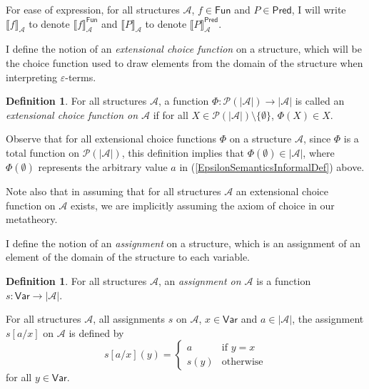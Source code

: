 \documentclass[10pt]{article}
\theoremstyle{definition}\newtheorem{remark}[theorem]{Remark}
\theoremstyle{definition}\newtheorem{example}[theorem]{Example}
\theoremstyle{definition}\newtheorem{definition}[theorem]{Definition}
\newcommand{\variablesSet}{\mathsf{Var}}
\newcommand{\functionsSet}{\mathsf{Fun}}
\newcommand{\predicatesSet}{\mathsf{Pred}}
\begin{document}
	For ease of expression, for all structures $\mathcal{A}$, $f \in \functionsSet$ and $P \in \predicatesSet$, I will write $\llbracket f \rrbracket_\mathcal{A}$ to denote $\llbracket f \rrbracket_\mathcal{A}^{\functionsSet}$ and $\llbracket P \rrbracket_\mathcal{A}$ to denote $\llbracket P \rrbracket_\mathcal{A}^{\predicatesSet}$.

	I define the notion of an \textit{extensional choice function} on a structure, which will be the choice function used to draw elements from the domain of the structure when interpreting $\varepsilon$-terms.

	\begin{definition}
		For all structures $\mathcal{A}$, a function $\Phi: \mathcal{P}(| \mathcal{A} |) \rightarrow | \mathcal{A} |$ is called an \textit{extensional choice function on $\mathcal{A}$} if for all $X \in \mathcal{P}(| \mathcal{A} |) \setminus \{\emptyset\}$, $\Phi(X) \in X$.
	\end{definition}

	Observe that for all extensional choice functions $\Phi$ on a structure $\mathcal{A}$, since $\Phi$ is a total function on $\mathcal{P}(| \mathcal{A} |)$, this definition implies that $\Phi(\emptyset) \in | \mathcal{A} |$, where $\Phi(\emptyset)$ represents the arbitrary value $a$ in (\ref{EpsilonSemanticsInformalDef}) above.
	
	Note also that in assuming that for all structures $\mathcal{A}$ an extensional choice function on $\mathcal{A}$ exists, we are implicitly assuming the axiom of choice in our metatheory.
	
	I define the notion of an \textit{assignment} on a structure, which is an assignment of an element of the domain of the structure to each variable.
	
	\begin{definition}
		For all structures $\mathcal{A}$, an \textit{assignment on $\mathcal{A}$} is a function $s: \variablesSet \rightarrow | \mathcal{A} |$.
		
		For all structures $\mathcal{A}$, all assignments $s$ on $\mathcal{A}$, $x \in \variablesSet$ and $a \in | \mathcal{A} |$, the assignment $s [a / x]$ on $\mathcal{A}$ is defined by
		\[
			s [a / x](y) = \begin{cases}
				a & \text{if $y = x$} \\
				s(y) & \text{otherwise}
			\end{cases}
		\]
		for all $y \in \variablesSet$.
	\end{definition}
\end{document}
